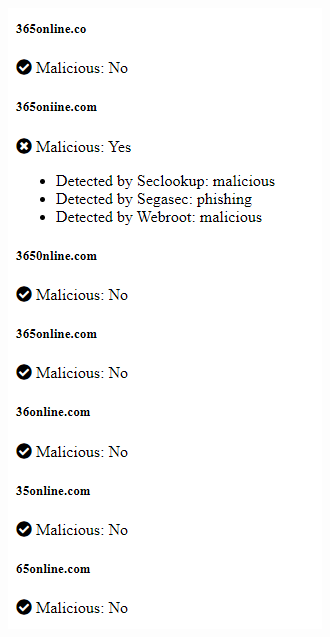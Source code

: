 \begin{figure}[H]
  \centering
  \begin{subfigure}[b]{0.25\textwidth}
    \includegraphics[width=\textwidth]{project/2222.png}
    \label{fig:left}
  \end{subfigure}

\end{figure}
